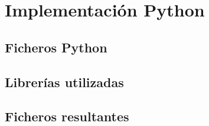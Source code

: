 \section{Implementación Python}

\subsection{Ficheros Python}

\subsection{Librerías utilizadas}

\subsection{Ficheros resultantes}